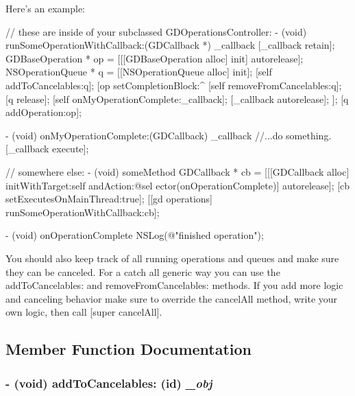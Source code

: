 Here's an example: 
\begin{DoxyCode}
 // these are inside of your subclassed GDOperationsController:
 - (void) runSomeOperationWithCallback:(GDCallback *) _callback {
        [_callback retain];
        GDBaseOperation * op = [[[GDBaseOperation alloc] init] autorelease];
        NSOperationQueue * q = [[NSOperationQueue alloc] init];
        [self addToCancelables:q];
        [op setCompletionBlock:^{
                [self removeFromCancelables:q];
                [q release];
                [self onMyOperationComplete:_callback];
                [_callback autorelease];
        }];
        [q addOperation:op];
 }
 
 - (void) onMyOperationComplete:(GDCallback) _callback {
        //...do something.
        [_callback execute];
 }
 
 // somewhere else:
 - (void) someMethod {
        GDCallback * cb = [[[GDCallback alloc] initWithTarget:self andAction:@sel
      ector(onOperationComplete)] autorelease];
        [cb setExecutesOnMainThread:true];
        [[gd operations] runSomeOperationWithCallback:cb];
 }
 
 - (void) onOperationComplete {
        NSLog(@"finished operation");
 }
\end{DoxyCode}


You should also keep track of all running operations and queues and make sure they can be canceled. For a catch all generic way you can use the addToCancelables: and removeFromCancelables: methods. If you add more logic and canceling behavior make sure to override the cancelAll method, write your own logic, then call \mbox{[}super cancelAll\mbox{]}. 

\subsection{Member Function Documentation}
\hypertarget{interface_g_d_operations_controller_ac387e516835185c6e49528528d8455ce}{
\subsubsection[{addToCancelables:}]{\setlength{\rightskip}{0pt plus 5cm}-\/ (void) addToCancelables: (id) {\em \_\-obj}}}
\label{interface_g_d_operations_controller_ac387e516835185c6e49528528d8455ce}


